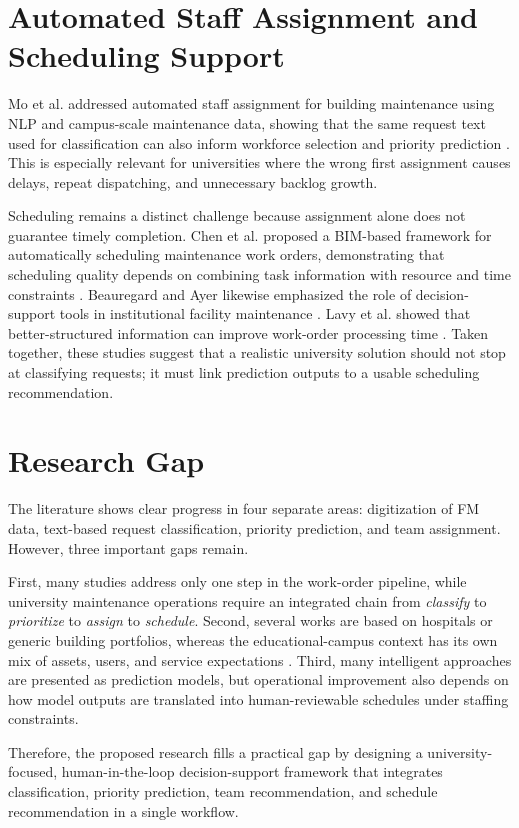 \documentclass[11pt,a4paper]{report}
\begin{document}
\section{Automated Staff Assignment and Scheduling Support}
Mo et al. addressed automated staff assignment for building maintenance using \ac{NLP} and campus-scale maintenance data, showing that the same request text used for classification can also inform workforce selection and priority prediction \cite{mo2020}. This is especially relevant for universities where the wrong first assignment causes delays, repeat dispatching, and unnecessary backlog growth.

Scheduling remains a distinct challenge because assignment alone does not guarantee timely completion. Chen et al. proposed a \ac{BIM}-based framework for automatically scheduling maintenance work orders, demonstrating that scheduling quality depends on combining task information with resource and time constraints \cite{chen2018}. Beauregard and Ayer likewise emphasized the role of decision-support tools in institutional facility maintenance \cite{beauregard2019}. Lavy et al. showed that better-structured information can improve work-order processing time \cite{lavy2019}. Taken together, these studies suggest that a realistic university solution should not stop at classifying requests; it must link prediction outputs to a usable scheduling recommendation.

\section{Research Gap}
The literature shows clear progress in four separate areas: digitization of \ac{FM} data, text-based request classification, priority prediction, and team assignment. However, three important gaps remain.

First, many studies address only one step in the work-order pipeline, while university maintenance operations require an integrated chain from \textit{classify} to \textit{prioritize} to \textit{assign} to \textit{schedule}. Second, several works are based on hospitals or generic building portfolios, whereas the educational-campus context has its own mix of assets, users, and service expectations \cite{besiktepe2019}. Third, many intelligent approaches are presented as prediction models, but operational improvement also depends on how model outputs are translated into human-reviewable schedules under staffing constraints.

Therefore, the proposed research fills a practical gap by designing a university-focused, human-in-the-loop decision-support framework that integrates classification, priority prediction, team recommendation, and schedule recommendation in a single workflow.
\end{document}
